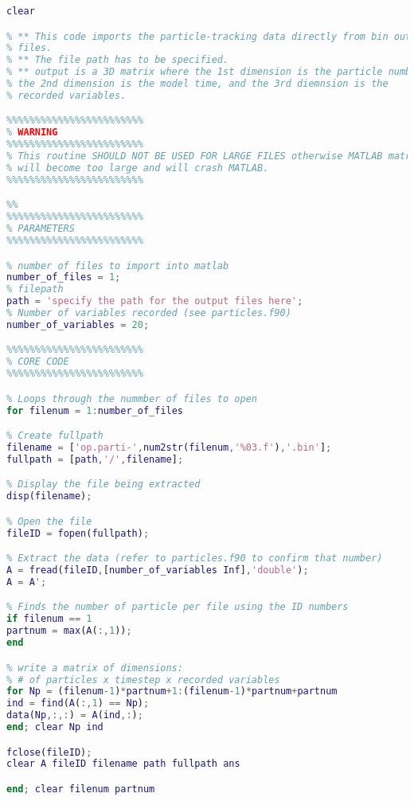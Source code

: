 \begin{lstlisting}[language=matlab]
clear

% ** This code imports the particle-tracking data directly from bin output
% files. 
% ** The file path has to be specified.
% ** output is a 3D matrix where the 1st dimension is the particle number,
% the 2nd dimension is the model time, and the 3rd diemnsion is the
% recorded variables.

%%%%%%%%%%%%%%%%%%%%%%%%
% WARNING
%%%%%%%%%%%%%%%%%%%%%%%%
% This routine SHOULD NOT BE USED FOR LARGE FILES otherwise MATLAB matrices
% will become too large and will crash MATLAB.
%%%%%%%%%%%%%%%%%%%%%%%%

%%
%%%%%%%%%%%%%%%%%%%%%%%%
% PARAMETERS
%%%%%%%%%%%%%%%%%%%%%%%%

% number of files to import into matlab
number_of_files = 1;
% filepath
path = 'specify the path for the output files here';
% Number of variables recorded (see particles.f90)
number_of_variables = 20;

%%%%%%%%%%%%%%%%%%%%%%%%
% CORE CODE
%%%%%%%%%%%%%%%%%%%%%%%%

% Loops through the nummber of files to open
for filenum = 1:number_of_files

% Create fullpath
filename = ['op.parti-',num2str(filenum,'%03.f'),'.bin'];
fullpath = [path,'/',filename];

% Display the file being extracted
disp(filename);

% Open the file
fileID = fopen(fullpath);

% Extract the data (refer to particles.f90 to confirm that number) 
A = fread(fileID,[number_of_variables Inf],'double');
A = A';

% Finds the number of particle per file using the ID numbers
if filenum == 1
partnum = max(A(:,1));
end

% write a matrix of dimensions:
% # of particles x timestep x recorded variables
for Np = (filenum-1)*partnum+1:(filenum-1)*partnum+partnum
ind = find(A(:,1) == Np);
data(Np,:,:) = A(ind,:);
end; clear Np ind

fclose(fileID);
clear A fileID filename path fullpath ans

end; clear filenum partnum
\end{lstlisting}